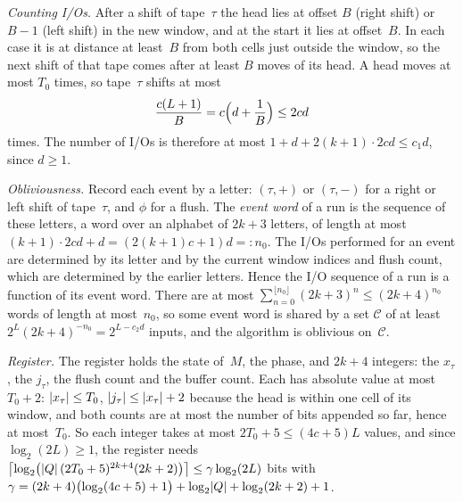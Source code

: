 \begin{outline}
\emph{Counting I/Os.} After a shift of tape~$\tau$ the head lies at offset $B$ (right shift) or $B-1$ (left shift) in the
new window, and at the start it lies at offset~$B$. In each case it is at distance at least~$B$ from both cells just
outside the window, so the next shift of that tape comes after at least $B$ moves of its head. A head moves at most $T_0$
times, so tape~$\tau$ shifts at most
\[
 \frac{c(L+1)}B=c\Bigl(d+\frac1B\Bigr)\le2cd
\]
times. The number of I/Os is therefore at most $1+d+2(k+1)\cdot2cd\le c_1d$, since $d\ge1$.

\emph{Obliviousness.} Record each event by a letter: $(\tau,+)$ or $(\tau,-)$ for a right or left shift of tape~$\tau$, and
$\phi$ for a flush. The \emph{event word} of a run is the sequence of these letters, a word over an alphabet of $2k+3$
letters, of length at most $(k+1)\cdot2cd+d=(2(k+1)c+1)d=:n_0$. The I/Os performed for an event are determined by its
letter and by the current window indices and flush count, which are determined by the earlier letters. Hence the I/O
sequence of a run is a function of its event word. There are at most $\sum_{n=0}^{\lfloor n_0\rfloor}(2k+3)^n\le(2k+4)^{n_0}$
words of length at most~$n_0$, so some event word is shared by a set $\mathcal C$ of at least
$2^L(2k+4)^{-n_0}=2^{L-c_2d}$ inputs, and the algorithm is oblivious on~$\mathcal C$.

\emph{Register.} The register holds the state of~$M$, the phase, and $2k+4$ integers: the $x_\tau$, the $j_\tau$, the
flush count and the buffer count. Each has absolute value at most $T_0+2$: $\lvert x_\tau \rvert\le T_0$,
$\lvert j_\tau \rvert\le\lvert x_\tau \rvert+2$ because the head is within one cell of its window, and both counts are at most the number
of bits appended so far, hence at most~$T_0$. So each integer takes at most $2T_0+5\le(4c+5)L$ values, and since
$\log_2(2L)\ge1$, the register needs
$\bigl\lceil\log_2\bigl(\lvert Q \rvert\,(2T_0+5)^{2k+4}(2k+2)\bigr)\bigr\rceil\le\gamma\log_2(2L)$ bits with
$\gamma=(2k+4)\bigl(\log_2(4c+5)+1\bigr)+\log_2\lvert Q \rvert+\log_2(2k+2)+1$.


\end{outline}

